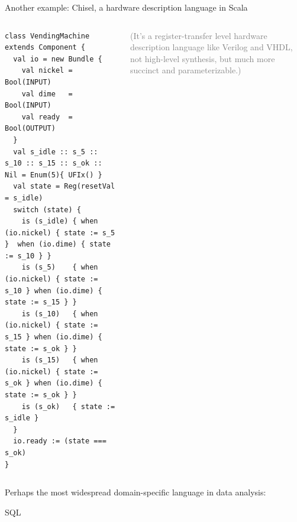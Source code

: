 \documentclass[aspectratio=169]{beamer}
\begin{document}
\begin{frame}[fragile]{Another example: Chisel, a hardware description language in Scala}
\scriptsize
\vspace{0.5 cm}

\begin{columns}
\begin{verbatim}
class VendingMachine extends Component {
  val io = new Bundle {
    val nickel = Bool(INPUT)
    val dime   = Bool(INPUT)
    val ready  = Bool(OUTPUT)
  }
  val s_idle :: s_5 :: s_10 :: s_15 :: s_ok :: Nil = Enum(5){ UFIx() }
  val state = Reg(resetVal = s_idle)
  switch (state) {
    is (s_idle) { when (io.nickel) { state := s_5 }  when (io.dime) { state := s_10 } }
    is (s_5)    { when (io.nickel) { state := s_10 } when (io.dime) { state := s_15 } }
    is (s_10)   { when (io.nickel) { state := s_15 } when (io.dime) { state := s_ok } }
    is (s_15)   { when (io.nickel) { state := s_ok } when (io.dime) { state := s_ok } }
    is (s_ok)   { state := s_idle }
  }
  io.ready := (state === s_ok)
}
\end{verbatim}

\large
\vspace{0.25 cm}
\textcolor{gray}{(It's a register-transfer level hardware description language like Verilog and VHDL, not high-level synthesis, but much more succinct and parameterizable.)}
\end{columns}
\end{frame}

\begin{frame}{}
\Large
\vspace{1 cm}
\begin{columns}
\begin{center}
Perhaps the most widespread domain-specific language in data analysis:

\vspace{0.5 cm}
{\Huge SQL}

\vspace{1 cm}
\end{center}
\end{columns}
\end{frame}
\end{document}
